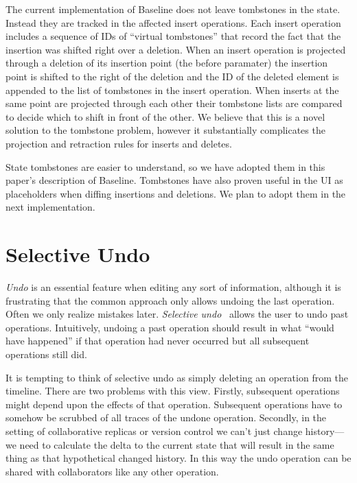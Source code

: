 \documentclass[english,submission]{programming}
\theoremstyle{definition}
\begin{document}
The current implementation of Baseline does not leave tombstones in the state. Instead they are tracked in the affected \textsf{insert} operations. Each insert operation includes a sequence of IDs of ``virtual tombstones'' that record the fact that the insertion was shifted right over a deletion.
When an insert operation is projected through a deletion of its insertion point (the \textsf{before} paramater) the insertion point is shifted to the right of the deletion and the ID of the deleted element is appended to the list of tombstones in the insert operation. When inserts at the same point are projected through each other their tombstone lists are compared to decide which to shift in front of the other. We believe that this is a novel solution to the tombstone problem,
however it substantially complicates the projection and retraction rules for inserts and deletes.

State tombstones are easier to understand, so we have adopted them in this paper's description of Baseline. Tombstones have also proven useful in the UI as placeholders when diffing insertions and deletions. We plan to adopt them in the next implementation.



\section{Selective Undo}\label{undo}

\textit{Undo} is an essential feature when editing any sort of information, although it is frustrating that the common approach only allows undoing the last operation. Often we only realize mistakes later. \textit{Selective undo}~\cite{berlage94} allows the user to undo past operations. Intuitively, undoing a past operation should result in what ``would have happened'' if that operation had never occurred but all subsequent operations still did.

It is tempting to think of selective undo as simply deleting an operation from the timeline. There are two problems with this view. Firstly, subsequent operations might depend upon the effects of that operation. Subsequent operations have to somehow be scrubbed of all traces of the undone operation. Secondly, in the setting of collaborative replicas or version control we can't just change history---we need to calculate the delta to the current state that will result in the same thing as that hypothetical changed history. In this way the undo operation can be shared with collaborators like any other operation.
\end{document}
